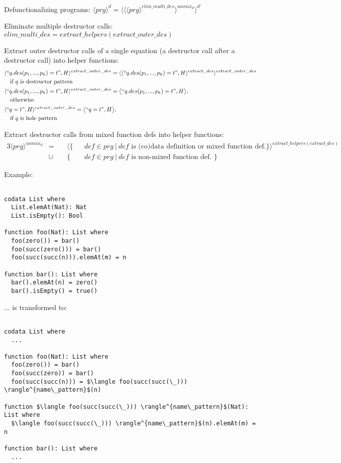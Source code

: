 \documentclass[11pt]{article} %
\begin{document}
Defunctionalizing programs: $\langle prg \rangle^d = \langle \langle \langle prg \rangle^{elim\_multi\_des} \rangle^{unmix_d} \rangle^{d'}$

Eliminate multiple destructor calls: $elim\_multi\_des = extract\_helpers(extract\_outer\_des)$

Extract outer destructor calls of a single equation (a destructor call after a destructor call) into helper functions:
\begin{alignat*}{2}
& \langle `` q.des(p_1, ..., p_k) = t ", H \rangle^{extract\_outer\_des} = \langle \langle `` q.des(p_1, ..., p_k) = t ", H \rangle^{extract\_des} \rangle^{extract\_outer\_des} \\
&\quad \textrm{if $q$ is destructor pattern } \\
& \langle `` q.des(p_1, ..., p_k) = t ", H \rangle^{extract\_outer\_des} = \big\langle `` q.des(p_1, ..., p_k) = t ", H \big\rangle, \\
&\quad \textrm{otherwise} \\
& \langle `` q = t ", H \rangle^{extract\_outer\_des} = \big\langle `` q = t ", H \big\rangle, \\
&\quad \textrm{if $q$ is hole pattern}
\end{alignat*}

Extract destructor calls from mixed function defs into helper functions:
\begin{alignat*}{3}
\langle prg \rangle^{unmix_d} & = ~&& \langle \{ && def \in prg ~ | ~ def \textrm{ is (co)data definition or mixed function def.} \} \rangle^{extract\_helpers(extract\_des)} \\
&\cup && \{ && def \in prg ~ | ~ def \textrm{ is non-mixed function def. } \}
\end{alignat*}

Example:

\begin{lstlisting}  

codata List where
  List.elemAt(Nat): Nat
  List.isEmpty(): Bool

function foo(Nat): List where
  foo(zero()) = bar()
  foo(succ(zero())) = bar()
  foo(succ(succ(n))).elemAt(m) = n

function bar(): List where
  bar().elemAt(n) = zero()
  bar().isEmpty() = true()

\end{lstlisting}

... is transformed to:

\begin{lstlisting}[mathescape]

codata List where
  ...

function foo(Nat): List where
  foo(zero()) = bar()
  foo(succ(zero)) = bar()
  foo(succ(succ(n))) = $\langle foo(succ(succ(\_))) \rangle^{name\_pattern}$(n)

function $\langle foo(succ(succ(\_))) \rangle^{name\_pattern}$(Nat): List where
  $\langle foo(succ(succ(\_))) \rangle^{name\_pattern}$(n).elemAt(m) = n

function bar(): List where
  ...

\end{lstlisting}
\end{document}
